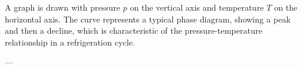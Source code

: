A graph is drawn with pressure \( p \) on the vertical axis and temperature \( T \) on the horizontal axis. The curve represents a typical phase diagram, showing a peak and then a decline, which is characteristic of the pressure-temperature relationship in a refrigeration cycle.

---